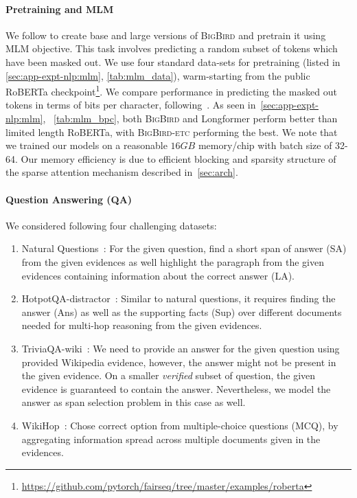 \paragraph{Pretraining and MLM} We follow \citep{devlin2018bert, liu2019roberta} to create base and large versions of \textsc{BigBird} and pretrain it using MLM objective. This task involves predicting a random subset of tokens which have been masked out. We use four standard data-sets for pretraining (listed in \ref{sec:app-expt-nlp:mlm}, \ref{tab:mlm_data}), warm-starting from the public RoBERTa checkpoint\footnote{\url{https://github.com/pytorch/fairseq/tree/master/examples/roberta}}. 
We compare performance in predicting the masked out tokens in terms of bits per character, following~\citep{beltagy2020longformer}. As seen in~\ref{sec:app-expt-nlp:mlm}, ~\ref{tab:mlm_bpc},  both \textsc{BigBird} and Longformer perform better than limited length RoBERTa, with \textsc{BigBird}-\textsc{etc} performing the best. We note that we trained our models on a reasonable $16GB$ memory/chip with batch size of 32-64. Our memory efficiency is due to efficient blocking and sparsity structure of the sparse attention mechanism described in~\ref{sec:arch}. 

\paragraph{Question Answering (QA)} We considered following four challenging datasets:

\begin{enumerate}[leftmargin=6mm, itemsep=2mm, partopsep=0pt,parsep=0pt]
\item  Natural Questions~\citep{kwiatkowski2019natural}: For the given question, find a short span of answer (SA) from the given evidences as well highlight the paragraph from the given evidences containing information about the correct answer (LA).
\item HotpotQA-distractor~\citep{yang2018hotpotqa}: Similar to natural questions, it requires finding the answer (Ans) as well as the supporting facts (Sup) over different documents needed for multi-hop reasoning from the given evidences. 
\item TriviaQA-wiki~\citep{JoshiTriviaQA2017}: We need to provide an answer for the given question using provided Wikipedia evidence, however, the answer might not be present in the given evidence. On a smaller \emph{verified} subset of question, the given evidence is guaranteed to contain the answer. Nevertheless, we model the answer as span selection problem in this case as well.
\item  WikiHop~\citep{welbl2018constructing}: Chose correct option from multiple-choice questions (MCQ), by aggregating information spread across multiple documents given in the evidences.
\end{enumerate}


